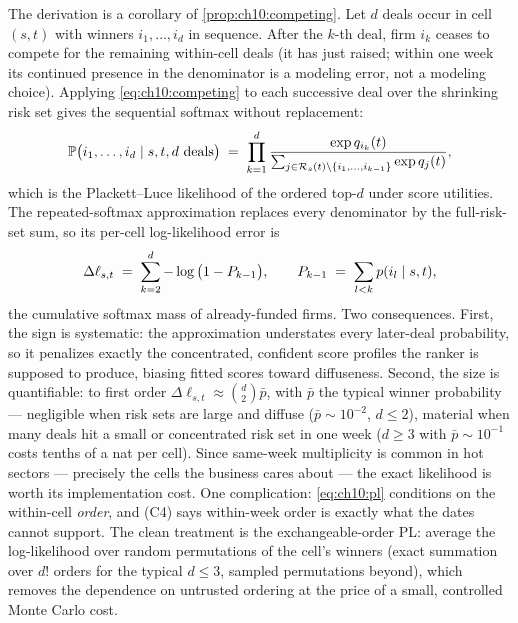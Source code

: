 The derivation is a corollary of \cref{prop:ch10:competing}. Let $d$
deals occur in cell $(s,t)$ with winners $i_1, \dots, i_d$ in sequence.
After the $k$-th deal, firm $i_k$ ceases to compete for the remaining
within-cell deals (it has just raised; within one week its continued
presence in the denominator is a modeling error, not a modeling choice).
Applying \cref{eq:ch10:competing} to each successive deal over the
shrinking risk set gives the sequential softmax without replacement:
\begin{equation}\label{eq:ch10:pl}
\mathbb{P}\big(i_1, \dots, i_d \mid s, t, d \text{ deals}\big)
 \;=\;
 \prod_{k=1}^{d}
 \frac{\exp q_{i_k}(t)}
      {\sum_{j \in \mathcal{R}_s(t) \setminus \{i_1, \dots, i_{k-1}\}}
       \exp q_j(t)} ,
\end{equation}
which is the Plackett--Luce likelihood of the ordered top-$d$ under score
utilities. The repeated-softmax approximation replaces every denominator
by the full-risk-set sum, so its per-cell log-likelihood error is
\begin{equation}\label{eq:ch10:plbias}
\Delta \ell_{s,t}
 \;=\;
 \sum_{k=2}^{d} -\log\big(1 - P_{k-1}\big),
 \qquad
 P_{k-1} \;=\; \sum_{l < k} p(i_l \mid s, t),
\end{equation}
the cumulative softmax mass of already-funded firms. Two consequences.
First, the sign is systematic: the approximation understates every
later-deal probability, so it penalizes exactly the concentrated,
confident score profiles the ranker is supposed to produce, biasing
fitted scores toward diffuseness. Second, the size is quantifiable: to
first order $\Delta \ell_{s,t} \approx \binom{d}{2} \bar p$, with $\bar
p$ the typical winner probability --- negligible when risk sets are large
and diffuse ($\bar p \sim 10^{-2}$, $d \le 2$), material when many deals
hit a small or concentrated risk set in one week ($d \ge 3$ with $\bar p
\sim 10^{-1}$ costs tenths of a nat per cell). Since same-week
multiplicity is common in hot sectors --- precisely the cells the
business cares about --- the exact likelihood is worth its
implementation cost. One complication:
\cref{eq:ch10:pl} conditions on the within-cell \emph{order}, and (C4)
says within-week order is exactly what the dates cannot support. The
clean treatment is the exchangeable-order PL: average the log-likelihood
over random permutations of the cell's winners (exact summation over
$d!$ orders for the typical $d \le 3$, sampled permutations beyond),
which removes the dependence on untrusted ordering at the price of a
small, controlled Monte Carlo cost.

